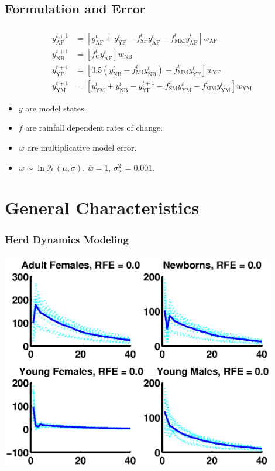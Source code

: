 \documentclass[mathserif]{beamer}
\begin{document}
\subsection{Formulation and Error}
\begin{frame}
\begin{center}
\frametitle{\insertsubsection}
\begin{align}
  y_{\text{AF}}^{t+1} &= [y_{\text{AF}}^t + y_{\text{YF}}^t - f_{\text{SF}}^ty_{\text{AF}}^t - f_{\text{MM}}^ty_{\text{AF}}^t]w_{\text{AF}}\\
  y_{\text{NB}}^{t+1} &= [f_{\text{C}}^ty_{\text{AF}}^t]w_{\text{NB}}\\
  y_{\text{YF}}^{t+1} &= [0.5(y_{\text{NB}}^t - f_{\text{MI}}^ty_{\text{NB}}^t) - f_{\text{MM}}^ty_{\text{YF}}^t]w_{\text{YF}}\\
  y_{\text{YM}}^{t+1} &= [y_{\text{YM}}^t + y_{\text{NB}}^t - y_{\text{YF}}^{t+1} - f_{\text{SM}}^ty_{\text{YM}}^t - f_{\text{MM}}^ty_{\text{YM}}^t]w_{\text{YM}}
\end{align}
\end{center}
\begin{itemize}
\item $y$ are model states.
\item $f$ are rainfall dependent rates of change.
\item $w$ are multiplicative model error.
\item $w\sim\ln\mathcal{N}(\mu,\sigma)$, $\bar{w}=1$, $\sigma_w^2 = 0.001$.
\end{itemize}
\end{frame}

\section{General Characteristics}

\begin{frame}
\frametitle{Herd Dynamics Modeling}
\tableofcontents[currentsection]
\end{frame}

\begin{frame}
\begin{center}
\frametitle{\insertsection}
\includegraphics[width=0.9\textwidth]{general0}
\end{center}
\end{frame}
\end{document}
